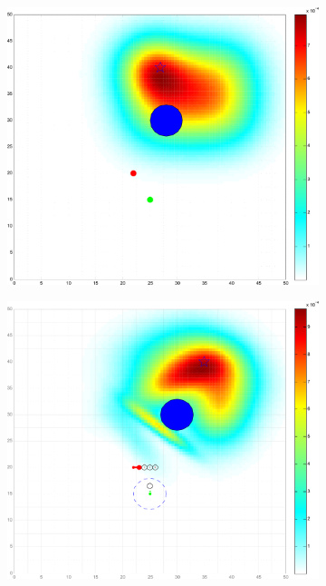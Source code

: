 \documentclass[twocolumn,10pt]{asme2e}
\begin{document}
\begin{figure}\label{scenario one}
\centering
	\begin{subfigure}[b]{0.2\textwidth}
		\includegraphics[width=\textwidth]{figures/clt_1_sim1_init_newcm1}
		\caption{}\label{fig:clt_1_sim_init}
	\end{subfigure}
	\begin{subfigure}[b]{0.2\textwidth}
		\includegraphics[width=\textwidth]{figures/clt_1_sim1_1ststep_newcm1}

\end{subfigure}
\end{figure}
\end{document}
